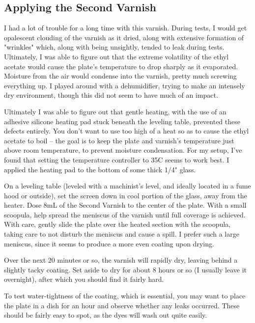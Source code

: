 \documentclass[11pt]{article}
\begin{document}
\subsection{Applying the Second Varnish}

I had a lot of trouble for a long time with this varnish. During tests, I would get opalescent clouding of the varnish as it dried, along with extensive formation of "wrinkles" which, along with being unsightly, tended to leak during tests. Ultimately, I was able to figure out that the extreme volatility of the ethyl acetate would cause the plate's temperature to drop sharply as it evaporated. Moisture from the air would condense into the varnish, pretty much screwing everything up. I played around with a dehumidifier, trying to make an intensely dry environment, though this did not seem to have much of an impact.\newline

Ultimately I was able to figure out that gentle heating, with the use of an adhesive silicone heating pad stuck beneath the leveling table, prevented these defects entirely. You don't want to use too high of a heat so as to cause the ethyl acetate to boil -- the goal is to keep the plate and varnish's temperature just above room temperature, to prevent moisture condensation. For my setup, I've found that setting the temperature controller to 35C seems to work best. I applied the heating pad to the bottom of some thick 1/4" glass.\newline

On a leveling table (leveled with a machinist's level, and ideally located in a fume hood or outside), set the screen down in cool portion of the glass, away from the heater. Dose 8mL of the Second Varnish to the center of the plate. With a small scoopula, help spread the meniscus of the varnish until full coverage is achieved. With care, gently slide the plate over the heated section with the scoopula, taking care to not disturb the meniscus and cause a spill. I prefer such a large meniscus, since it seems to produce a more even coating upon drying.\newline

Over the next 20 minutes or so, the varnish will rapidly dry, leaving behind a slightly tacky coating. Set aside to dry for about 8 hours or so (I usually leave it overnight), after which you should find it fairly hard.\newline

To test water-tightness of the coating, which is essential, you may want to place the plate in a dish for an hour and observe whether any leaks occurred. These should be fairly easy to spot, as the dyes will wash out quite easily.\newline
\end{document}
